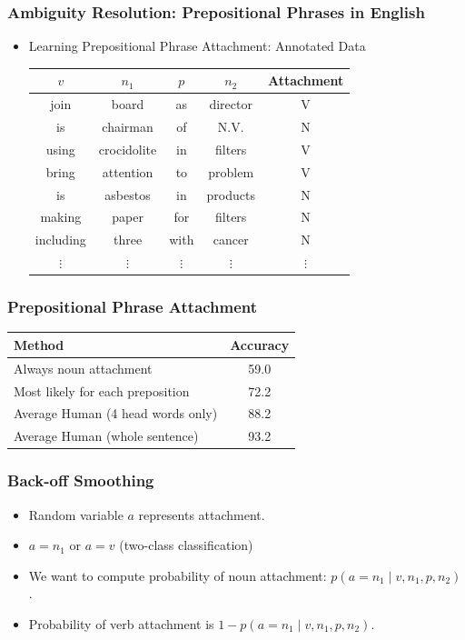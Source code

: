 \begin{frame}
\frametitle{Ambiguity Resolution: Prepositional Phrases in English}
  \begin{itemize}[<+->]
  \item Learning Prepositional Phrase Attachment: Annotated Data
\begin{tabular}{|cccc|c|}
\hline
$v$    &     $n_1$   &      $p$ & $n_2$ &       Attachment\\
\hline
join   &   board    &   as &  director & V \\
is       & chairman  &  of  & N.V.    & N \\
using  &   crocidolite & in  & filters & V \\
bring  &   attention  & to  & problem &  V \\ 
is      &  asbestos   & in &  products & N \\
making &   paper    &   for & filters & N \\
including & three     &  with & cancer &  N \\
$\vdots$ & $\vdots$ & $\vdots$ & $\vdots$ & $\vdots$ \\
\hline
\end{tabular}
  \end{itemize}

\end{frame}

\begin{frame}
\frametitle{Prepositional Phrase Attachment}
\begin{tabular}{|l|c|}  \hline
Method & Accuracy \\ \hline
Always noun attachment & 59.0 \\
Most likely for each preposition & 72.2 \\
Average Human (4 head words only) & 88.2 \\
Average Human (whole sentence) & 93.2 \\  \hline
\end{tabular}

\end{frame}

\begin{frame}
\frametitle{Back-off Smoothing}
\begin{itemize}[<+->]
\item Random variable $a$ represents attachment. 
\item $a = n_1$ or $a = v$ (two-class classification)
\item We want to compute probability of noun attachment: $p(a = n_1 \mid v, n_1, p, n_2)$. 
\item Probability of verb attachment is $1 - p(a = n_1 \mid v, n_1, p, n_2)$.
\end{itemize}
\end{frame}

